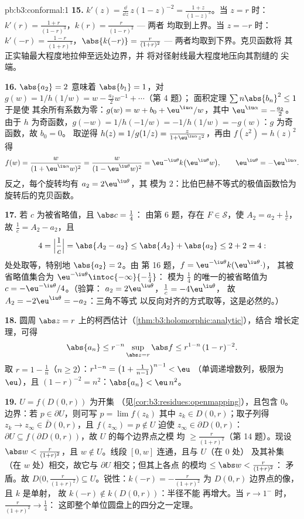 \begin{solution}{pb:b3:conformal:1}
\textbf{15.} $k'(z) = \frac{\dd}{\dd z}\,z(1 - z)^{-2} =
\frac{1 + z}{(1 - z)^3}$。当 $z = r$ 时：$k'(r) =
\frac{1+r}{(1-r)^3}$，$k(r) = \frac r{(1-r)^2}$ --- 两者
均取到上界。当 $z = -r$ 时：$k'(-r) =
\frac{1-r}{(1+r)^3}$，$\abs{k(-r)} = \frac r{(1+r)^2}$
--- 两者均取到下界。克贝函数将
其正实轴最大程度地拉伸至远处边界，并
将对径射线最大程度地压向其割缝的
尖端。

\textbf{16.} $\abs{a_2} = 2$ 意味着 $\abs{b_1} = 1$，对 $g(w)
= 1/h(1/w) = w - \frac{a_2}2w^{-1} + \cdots$（第 4 题）；
面积定理 $\sum n\abs{b_n}^2 \leq 1$ 于是使
其余所有系数为零：$g(w) = w + b_0 + \eu^{\iu\alpha}/w$，其中
$\eu^{\iu\alpha} = -\frac{a_2}2$。由于 $h$ 为奇函数，$g(-w) =
1/h(-1/w) = -1/h(1/w) = -g(w)$：$g$ 为奇函数，故 $b_0 = 0$。
取逆得 $h(z) = 1/g(1/z) = \frac{z}{1 +
\eu^{\iu\alpha}z^2}$，再由 $f(z^2) = h(z)^2$ 得
\[
f(w) = \frac{w}{(1 + \eu^{\iu\alpha}w)^2}
= \frac{w}{(1 - \eu^{\iu\theta}w)^2}
= \eu^{-\iu\theta}k\bigl(\eu^{\iu\theta}w\bigr),
\qquad \eu^{\iu\theta} = -\eu^{\iu\alpha} .
\]
反之，每个旋转均有 $a_2 = 2\eu^{\iu\theta}$，其
模为 $2$：比伯巴赫不等式的极值函数恰为
旋转后的克贝函数。

\textbf{17.} 若 $c$ 为被省略值，且 $\abs c = \frac14$：
由第 6 题，存在 $F \in \mathcal S$，使 $A_2 = a_2 +
\frac1c$，故 $\frac1c = A_2 - a_2$，且
\[
4 = \Bigl|\frac1c\Bigr| = \abs{A_2 - a_2}
\leq \abs{A_2} + \abs{a_2} \leq 2 + 2 = 4 :
\]
处处取等，特别地 $\abs{a_2} = 2$。由
第 16 题，$f = \eu^{-\iu\theta}k(\eu^{\iu\theta}\cdot)$，
其被省略值集合为 $\eu^{-\iu\theta}
\intoc{-\infty}{-\frac14}$：
模为 $\frac14$ 的唯一的被省略值为 $c = -\eu^{-\iu\theta}/4$。（验算：
$a_2 = 2\eu^{\iu\theta}$，$\frac1c = -4\eu^{\iu\theta}$，
故 $A_2 = -2\eu^{\iu\theta} = -a_2$：三角不等式
以反向对齐的方式取等，这是必然的。）

\textbf{18.} 圆周 $\abs z =
r$ 上的柯西估计（\cref{thm:b3:holomorphic:analytic}），结合
增长定理，可得
\[
\abs{a_n} \leq r^{-n}\sup_{\abs z = r}\abs f
\leq r^{1-n}\,(1 - r)^{-2} .
\] 取 $r = 1 - \frac1n$（$n \geq
2$）：$r^{1-n} = \bigl(1 + \frac1{n-1}\bigr)^{n-1} < \eu$
（单调递增数列，极限为 $\eu$），且 $(1 - r)^{-2} =
n^2$：$\abs{a_n} < \eu\,n^2$。

\textbf{19.} $U = f(D(0, r))$ 为开集
（见\cref{cor:b3:residues:openmapping}），且包含 $0$。
边界：若 $p \in \partial U$，则可写 $p = \lim f(z_k)$
其中 $z_k \in D(0, r)$；取子列得 $z_k \to z_\infty
\in \bar D(0, r)$，且 $f(z_\infty) = p \notin U$ 迫使
$z_\infty \in \partial D(0, r)$：$\partial U \subseteq
f(\partial D(0, r))$，故 $U$ 的每个边界点之模
均 $\geq \frac r{(1+r)^2}$（第 14 题）。现设
$\abs w < \frac r{(1+r)^2}$，且 $w \notin U$。线段
$[0, w]$ 连通，且与 $U$（在 $0$ 处）
及其补集（在 $w$ 处）相交，故它与 $\partial U$ 相交；但其上各点
的模均 $\leq \abs w < \frac r{(1+r)^2}$：
矛盾。故 $D\bigl(0, \frac r{(1+r)^2}\bigr)
\subseteq U$。锐性：$k(-r) = -\frac r{(1+r)^2}$ 为
$D(0,r)$ 边界点的像，且 $k$ 是单射，
故 $k(-r) \notin k(D(0, r))$：半径不能
再增大。当 $r \to 1^-$ 时，$\frac r{(1+r)^2} \to \frac14$：
这即整个单位圆盘上的四分之一定理。


\end{solution}

